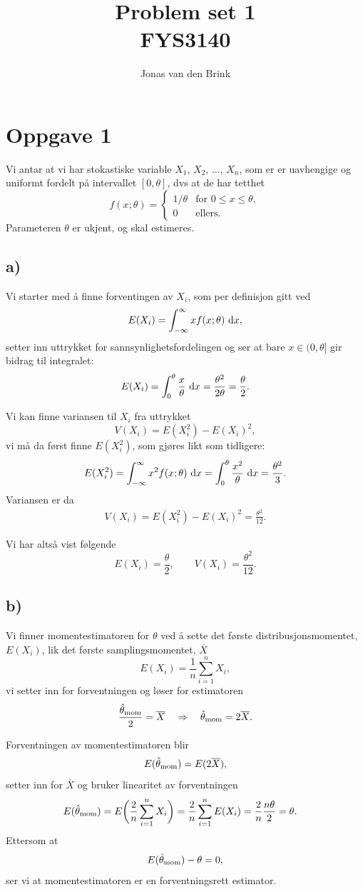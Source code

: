 \documentclass[a4paper, 11pt, titlepage, english]{article}
\author{Jonas van den Brink}
\title{Problem set 1 \\ FYS3140}
\renewcommand{\d}{{\rm d}}
\newcommand{\To}{\quad \Rightarrow\quad}
\begin{document}
\section*{Oppgave 1}
Vi antar at vi har stokastiske variable $X_1$, $X_2$, $\ldots$, $X_n$, som er er uavhengige og uniformt fordelt på intervallet $[0,\theta]$, dvs at de har tetthet
$$f(x; \theta) = \begin{cases}
                  1/\theta & \mbox{for } 0 \leq x \leq \theta, \\
                  0 & \mbox{ellers}.
                 \end{cases}$$
Parameteren $\theta$ er ukjent, og skal estimeres.
\subsection*{a)}
Vi starter med å finne forventingen av $X_i$, som per definisjon gitt ved
$$E(X_i) = \int_{-\infty}^\infty x f(x; \theta) \ \d x,$$
setter inn uttrykket for sannsynlighetsfordelingen og ser at bare $x\in(0,\theta]$ gir bidrag til integralet:
$$E(X_i) = \int_0^\theta \frac{x}{\theta} \ \d x = \frac{\theta^2}{2\theta} = \frac{\theta}{2}.$$

Vi kan finne variansen til $X_i$ fra uttrykket
$$V(X_i) = E(X_i^2) - E(X_i)^2,$$
vi må da først finne $E(X_i^2)$, som gjøres likt som tidligere:
$$E(X_i^2) = \int_{-\infty}^\infty x^2 f(x; \theta) \ \d x = \int_0^\theta \frac{x^2}{\theta} \ \d x = \frac{\theta^2}{3}.$$
Variansen er da
\begin{align*}
V(X_i) = E(X_i^2) - E(X_i)^2 = \frac{\theta^2}{12}.
\end{align*}

Vi har altså vist følgende
$$E(X_i) = \frac{\theta}{2}, \qquad V(X_i) = \frac{\theta^2}{12}.$$

\subsection*{b)}
Vi finner momentestimatoren for $\theta$ ved å sette det første distribusjonsmomentet, $E(X_i)$, lik det første samplingsmomentet, $\overline{X}$
$$E(X_i) = \frac{1}{n}\sum_{i=1}^n X_i,$$
vi setter inn for forventningen og løser for estimatoren
$$\frac{\hat{\theta}_{\rm mom}}{2} = \overline{X} \To \hat{\theta}_{\rm mom} = 2\overline{X}.$$

Forventningen av momentestimatoren blir
$$E(\hat{\theta}_{\rm mom}) = E(2\overline{X}),$$
setter inn for $\overline{X}$ og bruker linearitet av forventningen
\begin{align*}
E(\hat{\theta}_{\rm mom}) &= E\bigg(\frac{2}{n}\sum_{i=1}^n X_i\bigg) = \frac{2}{n}\sum_{i=1}^n E(X_i) = \frac{2}{n}\frac{n\theta}{2} =  \theta.
\end{align*}
Ettersom at 
$$E(\hat{\theta}_{\rm mom}) - \theta = 0,$$
ser vi at momentestimatoren er en forventningsrett estimator.
\end{document}
